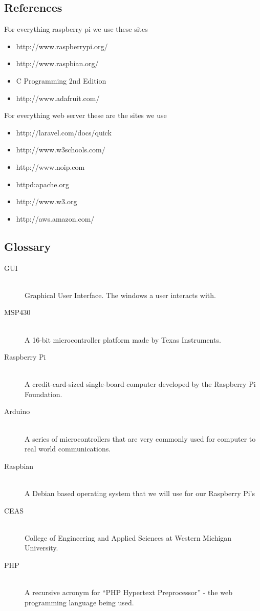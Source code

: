 \documentclass{report}
\begin{document}
\subsection*{References}
For everything raspberry pi we use these sites
\begin{itemize}
\item http://www.raspberrypi.org/
\item http://www.raspbian.org/
\item C Programming 2nd Edition
\item http://www.adafruit.com/
\end{itemize}
For everything web server these are the sites we use
\begin{itemize}
\item http://laravel.com/docs/quick
\item http://www.w3schools.com/
\item http://www.noip.com
\item httpd:apache.org
\item http://www.w3.org
\item http://aws.amazon.com/
\end{itemize}
\newpage
\subsection*{Glossary}
\begin{description}
\item [GUI] \hfill \\
Graphical User Interface. The windows a user interacts with.
\item [MSP430] \hfill \\
A 16-bit microcontroller platform made by Texas Instruments.
\item [Raspberry Pi] \hfill \\
 A credit-card-sized single-board computer developed by the Raspberry Pi Foundation.
\item [Arduino] \hfill \\
A series of microcontrollers that are very commonly used for computer to real world communications.
\item [Raspbian] \hfill \\
 A Debian based operating system that we will use for our Raspberry Pi’s
\item [CEAS] \hfill \\
College of Engineering and Applied Sciences at Western Michigan University.
\item [PHP] \hfill \\
A recursive acronym for “PHP Hypertext Preprocessor” - the web programming language being used.
\end{description}
\newpage
\end{document}
